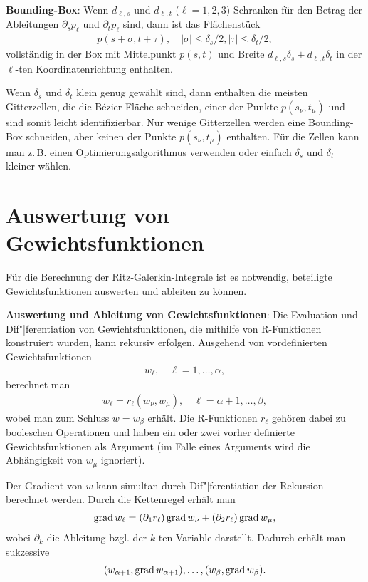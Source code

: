 \textbf{Bounding-Box}:
Wenn $d_{\ell,s}$ und $d_{\ell,t}$ ($\ell = 1, 2, 3$) Schranken für den Betrag der Ableitungen
$\partial_s p_\ell$ und $\partial_t p_\ell$ sind, dann ist das Flächenstück
\begin{align*}
    p(s + \sigma, t + \tau),\quad
    |\sigma| \le \delta_s/2,
    |\tau| \le \delta_t/2,
\end{align*}
vollständig in der Box mit Mittelpunkt $p(s, t)$ und Breite
$d_{\ell,s}\delta_s + d_{\ell,t}\delta_t$ in der $\ell$-ten Koordinatenrichtung enthalten.

Wenn $\delta_s$ und $\delta_t$ klein genug gewählt sind,
dann enthalten die meisten Gitterzellen, die die Bézier-Fläche schneiden,
einer der Punkte $p(s_\nu, t_\mu)$ und sind somit leicht identifizierbar.
Nur wenige Gitterzellen werden eine Bounding-Box schneiden, aber keinen der Punkte
$p(s_\nu, t_\mu)$ enthalten.
Für die Zellen kann man z.\,B. einen Optimierungsalgorithmus verwenden oder
einfach $\delta_s$ und $\delta_t$ kleiner wählen.

\section{%
    Auswertung von Gewichtsfunktionen%
}

Für die Berechnung der Ritz-Galerkin-Integrale ist es notwendig, beteiligte Gewichtsfunktionen
auswerten und ableiten zu können.

\textbf{Auswertung und Ableitung von Gewichtsfunktionen}:
Die Evaluation und Dif"|ferentiation von Gewichtsfunktionen, die mithilfe von R-Funktionen
konstruiert wurden, kann rekursiv erfolgen.
Ausgehend von vordefinierten Gewichtsfunktionen
\begin{align*}
    w_\ell,\quad
    \ell = 1, \dotsc, \alpha,
\end{align*}
berechnet man
\begin{align*}
    w_\ell = r_\ell(w_\nu, w_\mu),\quad
    \ell = \alpha + 1, \dotsc, \beta,
\end{align*}
wobei man zum Schluss $w = w_\beta$ erhält.
Die R-Funktionen $r_\ell$ gehören dabei zu booleschen Operationen und haben ein
oder zwei vorher definierte Gewichtsfunktionen als Argument
(im Falle eines Arguments wird die Abhängigkeit von $w_\mu$ ignoriert).

Der Gradient von $w$ kann simultan durch Dif"|ferentiation der Rekursion berechnet werden.
Durch die Kettenregel erhält man
\begin{align*}
    \operatorname{grad} w_\ell
    = (\partial_1 r_\ell) \operatorname{grad} w_\nu + (\partial_2 r_\ell) \operatorname{grad} w_\mu,
\end{align*}
wobei $\partial_k$ die Ableitung bzgl. der $k$-ten Variable darstellt.
Dadurch erhält man sukzessive
\begin{align*}
    (w_{\alpha+1}, \operatorname{grad} w_{\alpha+1}), \dotsc, (w_\beta, \operatorname{grad} w_\beta).
\end{align*}

